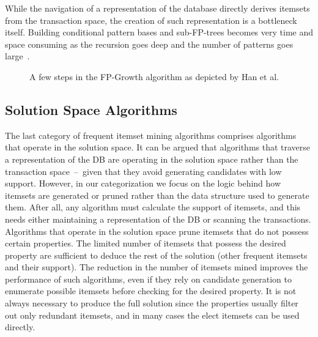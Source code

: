 \documentclass[letterpaper,12pt,titlepage,oneside,final]{book}
\begin{document}
While the navigation of a representation of the database directly
derives itemsets from the transaction space, 
the creation of such representation is a bottleneck itself. 
Building conditional pattern bases and sub-FP-trees becomes very time and space consuming as the recursion goes deep and the number of patterns goes large~\cite{wang2002top}.

\begin{figure}%
\centering
{}

\caption{A few steps in the FP-Growth algorithm as depicted by Han et al.~\cite{han2004mining}}
\label{fig:fpgrowth}
\end{figure}

\subsection{Solution Space Algorithms}
\label{sec:sol_space_algs}
The last category of frequent itemset mining algorithms comprises algorithms that operate in the solution space. 
It can be argued that algorithms that traverse a representation of the DB are operating in the solution space rather than the transaction space~--~given that they avoid generating candidates with low support. 
However, in our categorization we focus on the logic behind how itemsets are generated or pruned rather than the data structure used to generate them.
After all, any algorithm must calculate the support of itemsets, and this needs either maintaining a representation of the DB or scanning the transactions. 
Algorithms that operate in the solution space prune itemsets that do not possess certain properties. 
The limited number of itemsets that possess the desired property are sufficient to deduce the rest of the solution (other frequent itemsets and their support).
The reduction in the number of itemsets mined improves the performance of such algorithms, 
even if they rely on candidate generation to enumerate possible itemsets before checking for the desired property.
It is not always necessary to produce the full solution 
since the properties usually filter out only redundant itemsets, 
and in many cases the elect itemsets can be used directly.
\end{document}
